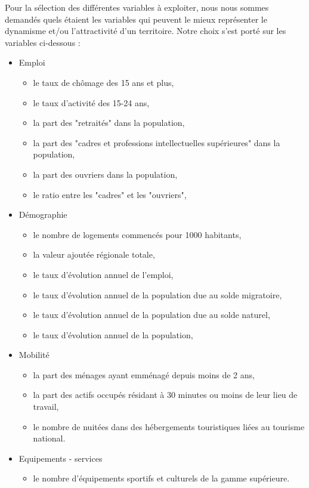 \documentclass{article}
\begin{document}
Pour la sélection des différentes variables à exploiter, nous nous sommes demandés quels étaient les variables qui peuvent le mieux représenter le dynamisme et/ou l'attractivité d'un territoire. Notre choix s'est porté sur les variables ci-dessous :

\begin{itemize}[label=\textbullet]
    \item Emploi
    \begin{itemize}[label=$\circ$]
        \item le taux de chômage des 15 ans et plus, 
        \item le taux d'activité des 15-24 ans,
        \item la part des "retraités" dans la population,
        \item la part des "cadres et professions intellectuelles supérieures" dans la population,
        \item la part des ouvriers dans la population,
        \item le ratio entre les "cadres" et les "ouvriers",
    \end{itemize}
    \item Démographie
    \begin{itemize}[label=$\circ$]
        \item le nombre de logements commencés pour 1000 habitants, 
        \item la valeur ajoutée régionale totale, 
        \item le taux d'évolution annuel de l'emploi, 
        \item le taux d'évolution annuel de la population due au solde migratoire, 
        \item le taux d'évolution annuel de la population due au solde naturel, 
        \item le taux d'évolution annuel de la population, 
    \end{itemize}
    \item Mobilité
    \begin{itemize}[label=$\circ$]
        \item la part des ménages ayant emménagé depuis moins de 2 ans,
        \item la part des actifs occupés résidant à 30 minutes ou moins de leur lieu de travail,
        \item le nombre de nuitées dans des hébergements touristiques liées au tourisme national.
    \end{itemize}
    \item Equipements - services
    \begin{itemize}[label=$\circ$]
        \item le nombre d'équipements sportifs et culturels de la gamme supérieure. 
    \end{itemize}
\end{itemize}
\end{document}
